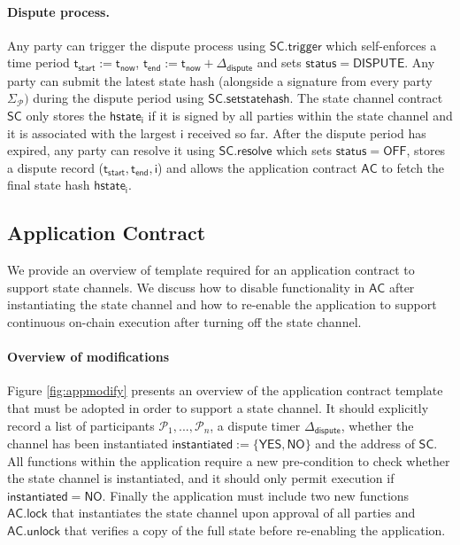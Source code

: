 \documentclass{llncs}
\newcommand{\instantiated}{\mathsf{instantiated}}
\newcommand{\instantiatedno}{\mathsf{NO}}
\newcommand{\instantiatedyes}{\mathsf{YES}}
\newcommand{\chanstatus}{\mathsf{status}}
\newcommand{\chandispute}{\mathsf{DISPUTE}}
\newcommand{\chanoff}{\mathsf{OFF}}
\newcommand{\hstatei}{\mathsf{hstate}_{\monotoniccounter}}
\newcommand{\monotoniccounter}{\mathsf{i}}
\newcommand{\participant}{\mathcal{P}}
\newcommand{\statechannel}{\mathsf{SC}}
\newcommand{\statechanneldispute}{\mathsf{SC}.\mathsf{trigger}}
\newcommand{\statechannelsetstate}{\mathsf{SC}.\mathsf{setstatehash}}
\newcommand{\statechannelresolve}{\mathsf{SC}.\mathsf{resolve}}
\newcommand{\appcontract}{\mathsf{AC}}
\newcommand{\applock}{\mathsf{AC.lock}}
\newcommand{\appunlock}{\mathsf{AC.unlock}}
\newcommand{\timerdispute}{\mathsf{\Delta}_{\mathsf{dispute}}}
\newcommand{\timenow}{\mathsf{t}_{\mathsf{now}}}
\newcommand{\timestart}{\mathsf{t}_{\mathsf{start}}}
\newcommand{\timeend}{\mathsf{t}_{\mathsf{end}}}
\newcommand{\timedispute}{\timenow + \mathsf{\Delta}_{\mathsf{dispute}}}
\begin{document}
\paragraph{Dispute process.} 

Any party can trigger the dispute process using $\statechanneldispute$ which self-enforces a time period $\timestart := \timenow$, $\timeend := \timedispute$ and sets $\chanstatus = \chandispute$. 
Any party can submit the latest state hash (alongside a signature from every party $\Sigma_{\participant})$ during the dispute period using $\statechannelsetstate$. 
The state channel contract $\statechannel$ only stores the $\hstatei$ if it is  signed by all parties within the state channel and it is  associated with the largest $\monotoniccounter$ received so far. 
After the dispute period has expired, any party can resolve it using $\statechannelresolve$ which sets $\chanstatus = \chanoff$, stores a dispute record ($\timestart,\timeend, \monotoniccounter$) and allows the application contract $\appcontract$ to fetch the final state hash $\hstatei$. 

\subsection{Application Contract}

We provide an overview of template required for an application contract to support state channels. 
We discuss how to disable functionality in $\appcontract$ after instantiating the state channel and how to re-enable the application to support continuous on-chain execution after turning off the state channel. 

\paragraph{Overview of modifications}
Figure \ref{fig:appmodify} presents an overview of the application contract template that must be adopted in order to support a state channel.
It should explicitly record a list of participants $\participant_{1},...,\participant_{n}$, a dispute timer $\timerdispute$, whether the channel has been instantiated  $\instantiated := \{\instantiatedyes, \instantiatedno\}$ and the address of $\statechannel$. 
All functions within the application require a new pre-condition to check whether the state channel is instantiated, and it should only permit execution if $\instantiated = \instantiatedno$. 
Finally the application must include two new functions $\applock$ that instantiates the state channel upon approval of all parties and $\appunlock$ that verifies a copy of the full state before re-enabling the application. 
\end{document}

